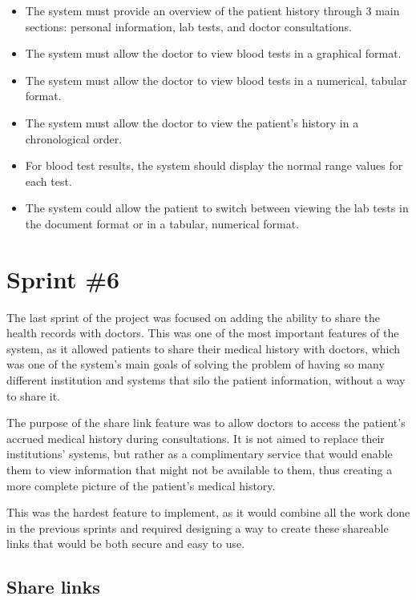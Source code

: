 \begin{itemize}
  \item The system must provide an overview of the patient history through 3 main sections: personal information, lab tests, and doctor consultations.
  \item The system must allow the doctor to view blood tests in a graphical format.
  \item The system must allow the doctor to view blood tests in a numerical, tabular format.
  \item The system must allow the doctor to view the patient's history in a chronological order.
  \item For blood test results, the system should display the normal range values for each test.
  \item The system could allow the patient to switch between viewing the lab tests in the document format or in a tabular, numerical format.
\end{itemize}

\section{Sprint \#6}

The last sprint of the project was focused on adding the ability to share the health records with doctors. This was one of the most important features of the system, as it allowed patients to share their medical history with doctors, which was one of the system's main goals of solving the problem of having so many different institution and systems that silo the patient information, without a way to share it. 

The purpose of the share link feature was to allow doctors to access the patient's accrued medical history during consultations. It is not aimed to replace their institutions' systems, but rather as a complimentary service that would enable them to view information that might not be available to them, thus creating a more complete picture of the patient's medical history.

This was the hardest feature to implement, as it would combine all the work done in the previous sprints and required designing a way to create these shareable links that would be both secure and easy to use.

\subsection{Share links}


